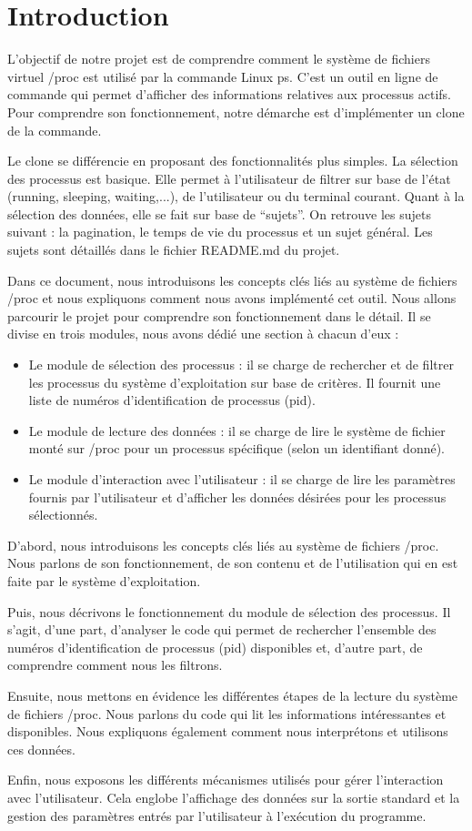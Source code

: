 \section{Introduction}
L'objectif de notre projet est de comprendre comment le système de fichiers virtuel /proc est utilisé par la commande Linux ps. C'est un outil en ligne de commande qui permet d’afficher des informations relatives aux processus actifs. Pour comprendre son fonctionnement, notre démarche est d'implémenter un clone de la commande.

Le clone se différencie en proposant des fonctionnalités plus simples.  La sélection des processus est basique. Elle permet à l’utilisateur de filtrer sur base de l’état (running, sleeping, waiting,...), de l’utilisateur ou du terminal courant. Quant à la sélection des données, elle se fait sur base de “sujets”. On retrouve les sujets suivant : la pagination, le temps de vie du processus et un sujet général. Les sujets sont détaillés dans le fichier README.md du projet.

Dans ce document, nous introduisons les concepts clés liés au système de fichiers /proc et nous expliquons comment nous avons implémenté cet outil. Nous allons parcourir le projet pour comprendre son fonctionnement dans le détail. Il se divise en trois modules, nous avons dédié une section à chacun d’eux :

\begin{itemize}
\item Le module de sélection des processus : il se charge de rechercher et de filtrer les processus du système d’exploitation sur base de critères. Il fournit une liste de numéros d’identification de processus (pid).
\item Le module de lecture des données : il se charge de lire le système de fichier monté sur /proc pour un processus spécifique (selon un identifiant donné).
\item Le module d’interaction avec l’utilisateur : il se charge de lire les paramètres fournis par l’utilisateur et d’afficher les données désirées pour les processus sélectionnés.
\end{itemize}

D’abord, nous introduisons les concepts clés liés au système de fichiers /proc. Nous parlons de son fonctionnement, de son contenu et de l'utilisation qui en est faite par le système d'exploitation.

Puis, nous décrivons le fonctionnement du module de sélection des processus. Il s’agit, d’une part, d’analyser le code qui permet de rechercher l’ensemble des numéros d’identification de processus (pid) disponibles et, d’autre part, de comprendre comment nous les filtrons.

Ensuite, nous mettons en évidence les différentes étapes de la lecture du système de fichiers /proc. Nous parlons du code qui lit les informations intéressantes et disponibles. Nous expliquons également comment nous interprétons et utilisons ces données.

Enfin, nous exposons les différents mécanismes utilisés pour gérer l’interaction avec l’utilisateur. Cela englobe l’affichage des données sur la sortie standard et la gestion des paramètres entrés par l’utilisateur à l’exécution du programme.